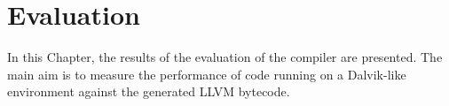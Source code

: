 \chapter{Evaluation}
\label{chap:evaluation}

In this Chapter, the results of the evaluation of the compiler are presented. The main aim is to measure the performance of code running on a Dalvik-like environment against the generated LLVM bytecode. 






